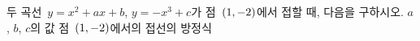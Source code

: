 두 곡선~$y=x^2+ax+b$, $y=-x^3+c$가 점~$(1{,}\mkern3mu\mathopen{}-2)$에서 접할 때, 다음을 구하시오. 
 $a$, $b$, $c$의 값
 점~$(1{,}\mkern3mu\mathopen{}-2)$에서의 접선의 방정식
